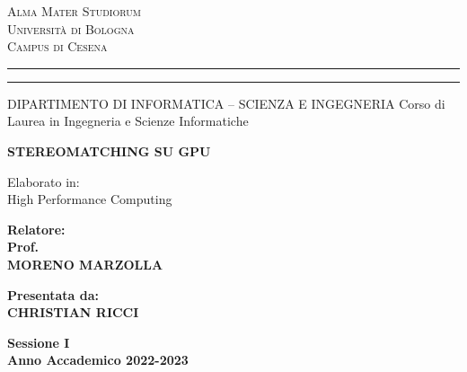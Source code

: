 \documentclass[12pt,a4paper,openright,twoside]{report}
\newcommand{\xstudent}{CHRISTIAN RICCI}
\newcommand{\xsupervisor}{MORENO MARZOLLA}
\begin{document}


\oddsidemargin=25pt

\begin{titlepage}
\begin{center}
    {\Large{\textsc{Alma Mater Studiorum}}}\\
    {\Large{\textsc{Universit\`a di Bologna}}} \\
    {\textsc{Campus di Cesena}}
    \rule[0.1cm]{14cm}{0.1mm}
    \rule[0.5cm]{14cm}{0.6mm}
    DIPARTIMENTO DI INFORMATICA – SCIENZA E INGEGNERIA
    Corso di Laurea in Ingegneria e Scienze Informatiche
\end{center}

\vspace{15mm}

\begin{center}
    {\LARGE{\bf STEREOMATCHING SU GPU}} \\
\end{center}

\vspace{15mm}

\begin{center}
     \large{ Elaborato in:\\ High Performance Computing\\}
\end{center}

\vspace{20mm}
\par
\noindent

\begin{minipage}[t]{0.47\textwidth}
    {\large{\bf Relatore:\\ Prof.\\ \xsupervisor}}
\end{minipage}
\hfill
\begin{minipage}[t]{0.47\textwidth}\raggedleft
    {\large{\bf Presentata da:\\ \xstudent}} \end{minipage}
\vspace{20mm}
\begin{center}
    \large{\bf Sessione I\\ Anno Accademico 2022-2023}
\end{center}
\end{titlepage}
\end{document}

